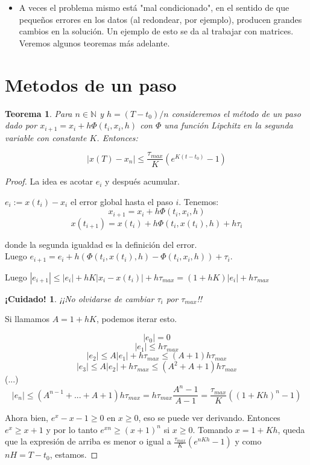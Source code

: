 \documentclass[10pt,a4paper,final]{report}
\newtheorem{theorem}{Teorema}
\newtheorem{caution}{¡Cuidado!}
\begin{document}
{\begin{itemize}
\begin{itemize}
	\item A veces el problema mismo está "mal condicionado", en el sentido de que pequeños errores en los datos (al redondear, por ejemplo), producen grandes cambios en la solución. Un ejemplo de esto se da al trabajar con matrices. Veremos algunos teoremas más adelante.
	\end{itemize}
\end{itemize}

}


\section{Metodos de un paso}
\begin{theorem}
    Para $n\in \mathbb{N}$ y $h=(T-t_0)/n$ consideremos el método de un paso dado por $x_{i+1}=x_i + h \Phi(t_i,x_i,h)$ con $\Phi$ una función Lipchitz en la segunda variable con constante $K$. Entonces:
    
    $$|x(T)-x_n|\leq \frac{\tau_{max}}{K} (e^{K(t-t_0)}-1)$$
\end{theorem}

\begin{proof}
    La idea es acotar $e_i$ y después acumular.
    
    $e_i := x(t_i)-x_i$ el error global hasta el paso $i$. Tenemos: \\
    
    $$x_{i+1}=x_i + h \Phi(t_i,x_i,h)$$
    $$x(t_{i+1})=x(t_i) + h \Phi(t_{i},x(t_i),h) + h \tau_i$$
    
    donde la segunda igualdad es la definición del error. \\
    
    Luego $e_{i+1} = e_i + h (\Phi(t_{i},x(t_{i}),h) - \Phi(t_i,x_i,h)) + \tau_i$.
    
    Luego $|e_{i+1}| \leq |e_i| + hK |x_i-x(t_i)| + h\tau_{max} = (1+hK) |e_i| + h\tau_{max}$
    
\begin{caution}
	¡¡No olvidarse de cambiar $\tau_i$ por $\tau_{max}$!!    
\end{caution}
    
    Si llamamos $A = 1 + hK$, podemos iterar esto.
    
    
    $$|e_0| = 0$$
    $$|e_1| \leq h\tau_{max}$$
    $$|e_2| \leq A |e_1| + h\tau_{max} \leq (A+1) h\tau_{max}$$
    $$|e_3| \leq A |e_2|+ h\tau_{max} \leq (A^2+A+1) h\tau_{max}$$
    (...)
    $$|e_n| \leq (A^{n-1}+...+A+1) h\tau_{max} = h\tau_{max} \frac{A^{n}-1}{A-1} = \frac{\tau_{max}}{K} ((1+Kh)^n-1)$$
    
    Ahora bien, $e^x-x-1\geq0$ en $x\geq0$, eso se puede ver derivando.
    Entonces $e^x \geq x+1$ y por lo tanto $e^{xn}\geq (x+1)^n$ si $x\geq0$. Tomando $x=1+Kh$, queda que la expresión de arriba es menor o igual a $\frac{\tau_{max}}{K} (e^{nKh}-1)$ y como $nH = T - t_0$, estamos.
    
\end{proof}
\end{document}
